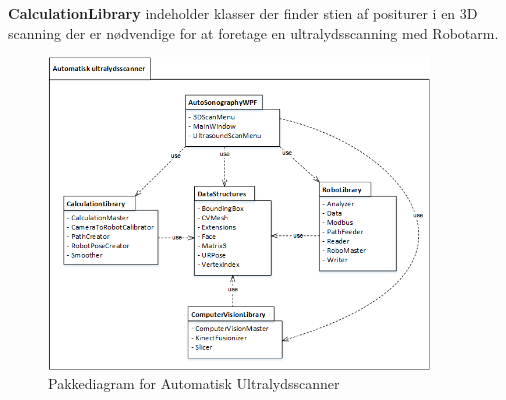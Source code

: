 \textbf{CalculationLibrary} indeholder klasser der finder stien af positurer i en 3D scanning der er nødvendige for at foretage en ultralydsscanning med Robotarm.

\begin{figure}[H]
    \centering
    \includegraphics[width=0.9\textwidth]{figurer/d/Design/Pakkediagram}
    \caption{Pakkediagram for Automatisk Ultralydsscanner}
    \label{Pakkediagram}
\end{figure}
\newpage
